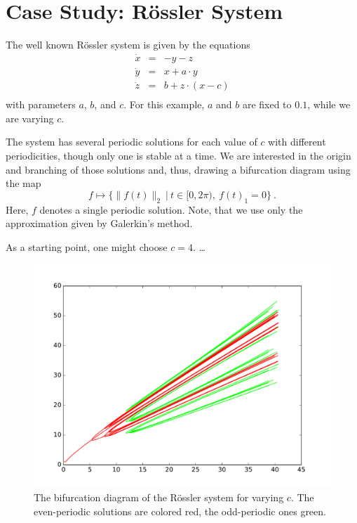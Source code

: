 \section{Case Study: Rössler System}

The well known Rössler system is given by the equations
\[
	\begin{array}{rcl}
		\dot x &=& -y - z \\
		\dot y &=& x + a \cdot y \\
		\dot z &=& b + z \cdot (x - c) \\
	\end{array}
\]
with parameters $a$, $b$, and $c$. For this example, $a$ and $b$
are fixed to $0.1$, while we are varying $c$.

The system has several periodic solutions for each value of $c$ with different
periodicities, though only one is stable at a time. We are interested in the origin and
branching of those solutions and, thus, drawing a bifurcation diagram using the map
\[
	f \mapsto \{ \|f(t)\|_2  \ | \ t \in [0, 2\pi), \ f(t)_1 = 0 \} \ .
\]
Here, $f$ denotes a single periodic solution. Note, that we use only the approximation
given by Galerkin's method.

As a starting point, one might choose $c=4$. \dots

\begin{figure}[!ht]
	\centering
	\includegraphics[width=1\textwidth]{img/roessler2a.pdf}
	\caption{The bifurcation diagram of the Rössler system for varying $c$. The
		even-periodic solutions are colored red, the odd-periodic ones green.}
\end{figure}


